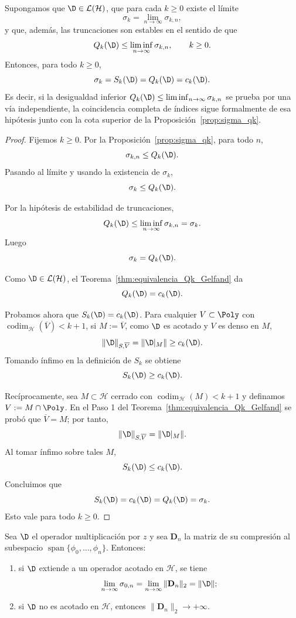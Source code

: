 \begin{prop}\label{prop:coincidencia_total_acotado}
	Supongamos que $\D\in\mathcal{L}(\mathcal{H})$, que para cada $k\ge0$ existe el límite
	\[
		\sigma_k=\lim_{n\to\infty}\sigma_{k,n},
	\]
	y que, además, las truncaciones son estables en el sentido de que
	\[
		Q_k(\D)\le \liminf_{n\to\infty}\sigma_{k,n},
		\qquad k\ge0.
	\]
	Entonces, para todo $k\ge0$,
	\[
		\sigma_k=S_k(\D)=Q_k(\D)=c_k(\D).
	\]
	Es decir, si la desigualdad inferior $Q_k(\D)\le \liminf_{n\to\infty}\sigma_{k,n}$
	se prueba por una vía independiente, la coincidencia completa de índices sigue
	formalmente de esa hipótesis junto con la cota superior de la
	Proposición~\ref{prop:sigma_qk}.
\end{prop}

\begin{proof}
	Fijemos $k\ge 0$. Por la Proposición~\ref{prop:sigma_qk}, para todo $n$,
	\[
		\sigma_{k,n}\le Q_k(\D).
	\]
	Pasando al límite y usando la existencia de $\sigma_k$,
	\[
		\sigma_k\le Q_k(\D).
	\]

	Por la hipótesis de estabilidad de truncaciones,
	\[
		Q_k(\D)\le \liminf_{n\to\infty}\sigma_{k,n}=\sigma_k.
	\]
	Luego
	\[
		\sigma_k=Q_k(\D).
	\]

	Como $\D\in\mathcal L(\mathcal H)$, el Teorema~\ref{thm:equivalencia_Qk_Gelfand} da
	\[
		Q_k(\D)=c_k(\D).
	\]

	Probamos ahora que $S_k(\D)=c_k(\D)$. Para cualquier
	$V\subset\Poly$ con $\operatorname{codim}_{\mathcal H}(\overline V)<k+1$, si
	$M:=\overline V$, como $\D$ es acotado y $V$ es denso en $M$,
	\[
		\|\D\|_{S,\overline V}=\|\D|_M\|\ge c_k(\D).
	\]
	Tomando ínfimo en la definición de $S_k$ se obtiene
	\[
		S_k(\D)\ge c_k(\D).
	\]

	Recíprocamente, sea $M\subset\mathcal H$ cerrado con
	$\operatorname{codim}_{\mathcal H}(M)<k+1$ y definamos
	$V:=M\cap\Poly$. En el Paso 1 del
	Teorema~\ref{thm:equivalencia_Qk_Gelfand} se probó que $\overline V=M$; por tanto,
	\[
		\|\D\|_{S,\overline V}=\|\D|_M\|.
	\]
	Al tomar ínfimo sobre tales $M$,
	\[
		S_k(\D)\le c_k(\D).
	\]
	Concluimos que
	\[
		S_k(\D)=c_k(\D)=Q_k(\D)=\sigma_k.
	\]
	Esto vale para todo $k\ge0$.
\end{proof}

\begin{prop}\label{prop:convergencia_sigma}
	Sea $\D$ el operador multiplicación por $z$ y sea $\mathbf{D}_n$ la matriz de su compresión al subespacio $\operatorname{span}\{\phi_0,\dots,\phi_n\}$. Entonces:
	\begin{enumerate}
		\item si $\D$ extiende a un operador acotado en $\mathcal{H}$, se tiene
		      \[
			      \lim_{n \to \infty} \sigma_{0,n} = \lim_{n \to \infty} \|\mathbf{D}_n\|_2 = \|\D\|;
		      \]
		\item si $\D$ no es acotado en $\mathcal{H}$, entonces $\|\mathbf{D}_n\|_2 \to +\infty$.
	\end{enumerate}
\end{prop}

